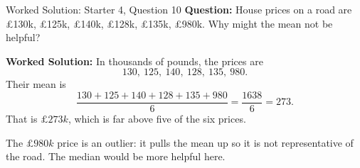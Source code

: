 \documentclass{beamer}
\begin{document}
\begin{frame}{Worked Solution: Starter 4, Question 10}
\textbf{Question:} House prices on a road are \pounds130k, \pounds125k, \pounds140k, \pounds128k, \pounds135k, \pounds980k. Why might the mean not be helpful?

\textbf{Worked Solution:}
In thousands of pounds, the prices are
\[
130,\ 125,\ 140,\ 128,\ 135,\ 980.
\]
Their mean is
\[
\frac{130 + 125 + 140 + 128 + 135 + 980}{6}
= \frac{1638}{6}
= 273.
\]
That is \(\pounds273k\), which is far above five of the six prices.

The \(\pounds980k\) price is an outlier: it pulls the mean up so it is not representative of the road. The median would be more helpful here.
\end{frame}

\end{document}
